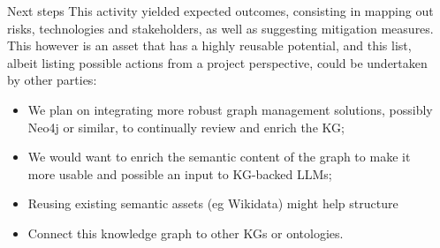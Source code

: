 \documentclass[final]{beamer}
\newlength{\sepmargin}
\newlength{\onecolwid}
\begin{document}
\begin{columns}[t]
\begin{column}{\onecolwid}
\begin{block}{Next steps}
                     This activity yielded expected outcomes, consisting in mapping out risks, technologies and stakeholders, as well as suggesting mitigation measures. This however is an asset that has a highly reusable potential, and this list, albeit listing possible actions from a project perspective, could be undertaken by other parties:
                                \begin{itemize}
\item We plan on integrating more robust graph management solutions, possibly Neo4j or similar, to continually review and enrich the KG;
\item We would want to enrich the semantic content of the graph to make it more usable and possible an input to KG-backed LLMs;
\item Reusing existing semantic assets (eg Wikidata) might help structure
\item Connect this knowledge graph to other KGs or ontologies.
                     \end{itemize}
          \end{block}
          
      \end{column}
      
      \begin{column}{\sepmargin} \end{column}
      \end{columns} 
       
\end{document}
